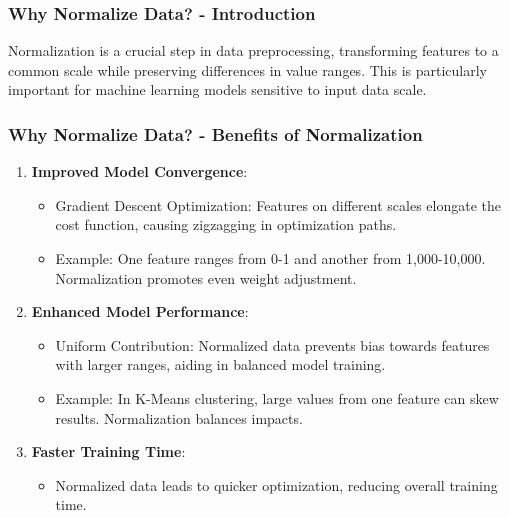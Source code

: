 \documentclass[aspectratio=169]{beamer}
\begin{document}
\begin{frame}[fragile]
  \frametitle{Why Normalize Data? - Introduction}
  Normalization is a crucial step in data preprocessing, transforming features to a common scale while preserving differences in value ranges. This is particularly important for machine learning models sensitive to input data scale.
\end{frame}

\begin{frame}[fragile]
  \frametitle{Why Normalize Data? - Benefits of Normalization}
  \begin{enumerate}
    \item \textbf{Improved Model Convergence}:
      \begin{itemize}
        \item Gradient Descent Optimization: Features on different scales elongate the cost function, causing zigzagging in optimization paths.
        \item Example: One feature ranges from 0-1 and another from 1,000-10,000. Normalization promotes even weight adjustment.
      \end{itemize}
      
    \item \textbf{Enhanced Model Performance}:
      \begin{itemize}
        \item Uniform Contribution: Normalized data prevents bias towards features with larger ranges, aiding in balanced model training.
        \item Example: In K-Means clustering, large values from one feature can skew results. Normalization balances impacts.
      \end{itemize}

    \item \textbf{Faster Training Time}:
      \begin{itemize}
        \item Normalized data leads to quicker optimization, reducing overall training time.
      \end{itemize}
  \end{enumerate}
\end{frame}
\end{document}
